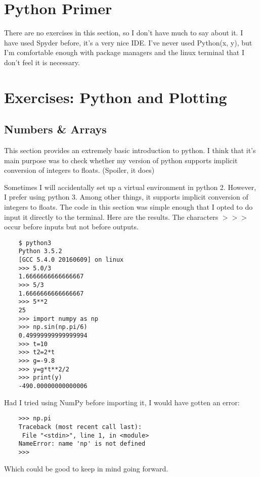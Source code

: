 \documentclass{article}
\begin{document}
\section{Python Primer}
There are no exercises in this section, so I don't have much to say about it. I
have used Spyder before, it's a very nice IDE. I've never used Python(x, y),
but I'm comfortable enough with package managers and the linux terminal that I
don't feel it is necessary.

\section{Exercises: Python and Plotting}
\subsection{Numbers \& Arrays}
This section provides an extremely basic introduction to python. I think that
it's main purpose was to check whether my version of python supports implicit
conversion of integers to floats. (Spoiler, it does)

Sometimes I will accidentally set up a virtual environment in python 2.
However, I prefer using python 3. Among other things, it supports implicit
conversion of integers to floats. The code in this section was simple enough
that I opted to do input it directly to the terminal. Here are the results.
The characters $>>>$ occur before inputs but not before outputs.

\begin{verbatim}
    $ python3
    Python 3.5.2 
    [GCC 5.4.0 20160609] on linux
    >>> 5.0/3
    1.6666666666666667
    >>> 5/3
    1.6666666666666667
    >>> 5**2
    25
    >>> import numpy as np
    >>> np.sin(np.pi/6)
    0.49999999999999994
    >>> t=10
    >>> t2=2*t
    >>> g=-9.8
    >>> y=g*t**2/2
    >>> print(y)
    -490.00000000000006
\end{verbatim}
Had I tried using NumPy before importing it, I would have gotten an error:
\begin{verbatim}
    >>> np.pi
    Traceback (most recent call last):
     File "<stdin>", line 1, in <module>
    NameError: name 'np' is not defined
    >>> 
\end{verbatim}
Which could be good to keep in mind going forward.
\end{document}
